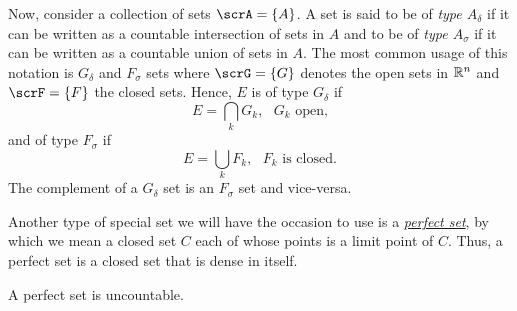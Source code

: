 Now, consider a collection of sets $\scrA=\{A\}$. A set is said to be of
\emph{type $A_\delta$} if it can be written as a countable intersection of
sets in $A$ and to be of \emph{type $A_\sigma$} if it can be written as a
countable union of sets in $A$. The most common usage of this notation is
$G_\delta$ and $F_\sigma$ sets where $\scrG=\{G\}$ denotes the open sets in
$\mathbb{R}^n$ and $\scrF=\{F\}$ the closed sets. Hence, $E$ is of type
\href{https://en.wikipedia.org/wiki/G-delta_set}{$G_\delta$} if
\begin{equation}
  \label{eq:1:g-delta-set}
E=\bigcap_k G_k,\text{ $G_k$ open,}
\end{equation}
and of type \href{https://en.wikipedia.org/wiki/F-sigma_set}{$F_\sigma$} if
\begin{equation}
  \label{eq:1:f-sigma}
E=\bigcup_k F_k,\text{ $F_k$ is closed.}
\end{equation}
The complement of a $G_\delta$ set is an $F_\sigma$ set and vice-versa.

Another type of special set we will have the occasion to use is a
\href{https://en.wikipedia.org/wiki/Perfect_set}{\emph{perfect set}}, by
which we mean a closed set $C$ each of whose points is a limit point of
$C$. Thus, a perfect set is a closed set that is dense in itself.

\begin{theorem}[1.9]
A perfect set is uncountable.
\end{theorem}

